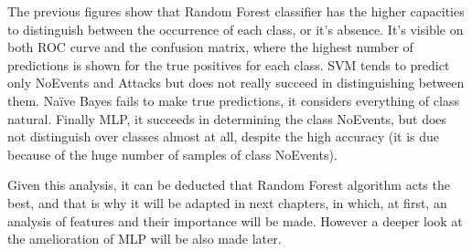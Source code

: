 The previous figures show that Random Forest classifier has the higher capacities to distinguish between the occurrence of each class, or it's absence. It's visible on both ROC curve and the confusion matrix, where the highest number of predictions is shown for the true positives for each class. SVM tends to predict only NoEvents and Attacks but does not really succeed in distinguishing between them. Naïve Bayes fails to make true predictions, it considers everything of class natural. Finally MLP, it succeeds in determining the class NoEvents, but does not distinguish over classes almost at all, despite the high accuracy (it is due because of the huge number of samples of class NoEvents).

Given this analysis, it can be deducted that Random Forest algorithm acts the best, and that is why it will be adapted in next chapters, in which, at first, an analysis of features and their importance will be made. However a deeper look at the amelioration of MLP will be also made later.

